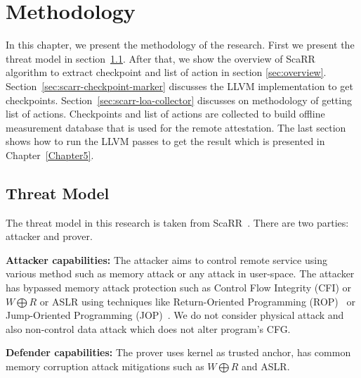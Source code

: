 
\chapter{Methodology} %

\label{Chapter4} %

In this chapter, we present the methodology of the research. First we present
the threat model in section~\ref{sec:threat-model}.  After that, we show the
overview of ScaRR algorithm to extract checkpoint and list of action in section
\ref{sec:overview}. Section~\ref{sec:scarr-checkpoint-marker} discusses the LLVM
implementation to get checkpoints. Section~\ref{sec:scarr-loa-collector}
discusses on methodology of getting list of actions.  
Checkpoints and list of actions are collected to build offline measurement
database that is used for the remote attestation. The last section shows how to
run the LLVM passes to get the result which is presented in
Chapter~\ref{Chapter5}.

\section{Threat Model}
\label{sec:threat-model}

The threat model in this research is taken from
ScaRR~\cite{toffaliniScaRRScalableRuntime2019}. There are two parties: attacker
and prover. 

\vspace{0.5cm}
\noindent \textbf{Attacker capabilities:} The attacker aims to control remote
service using various method such as memory attack or any attack in user-space.
The attacker has bypassed memory attack protection such as Control Flow
Integrity (CFI) or \( W \bigoplus R \) or ASLR using techniques like
Return-Oriented Programming
(ROP)~\cite{roemerReturnorientedProgrammingSystems2012} or Jump-Oriented
Programming (JOP)~\cite{bletschJumpOrientedProgrammingNew2011}. We do not
consider physical attack and also non-control data attack which does not alter
program's CFG.

\vspace{0.5cm}
\noindent \textbf{Defender capabilities:} The prover uses kernel as trusted
anchor, has common memory corruption attack mitigations such as \( W
\bigoplus R \) and ASLR.

